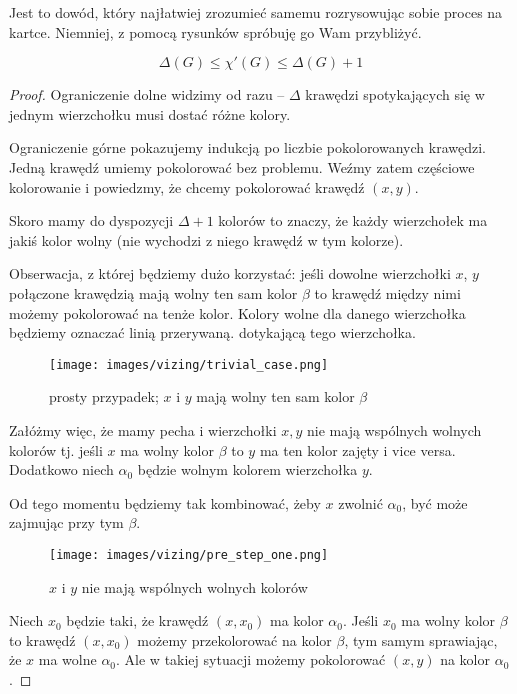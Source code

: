 Jest to dowód, który najłatwiej zrozumieć samemu rozrysowując sobie proces na kartce. Niemniej, z pomocą rysunków spróbuję go Wam przybliżyć.

\begin{theorem}[Vizing]
	\[\Delta(G) \leq \chi'(G) \leq \Delta(G) + 1\]
\end{theorem}

\begin{proof}
	Ograniczenie dolne widzimy od razu -- \(\Delta\) krawędzi spotykających się w jednym wierzchołku musi dostać różne kolory.

	Ograniczenie górne pokazujemy indukcją po liczbie pokolorowanych krawędzi. Jedną krawędź umiemy pokolorować bez problemu.
	Weźmy zatem częściowe kolorowanie i powiedzmy, że chcemy pokolorować krawędź \((x, y)\).

	Skoro mamy do dyspozycji \(\Delta + 1\) kolorów to znaczy, że każdy wierzchołek ma jakiś kolor wolny (nie wychodzi z niego krawędź w tym kolorze).

	Obserwacja, z której będziemy dużo korzystać: jeśli dowolne wierzchołki \(x\), \(y\) połączone krawędzią mają wolny ten sam kolor \(\beta\)
	to krawędź między nimi możemy pokolorować na tenże kolor. Kolory wolne dla danego wierzchołka będziemy oznaczać linią przerywaną. dotykającą tego wierzchołka.

	\begin{figure}[ht]
		\centering
		\texttt{[image: images/vizing/trivial\_case.png]}
		\caption{prosty przypadek; \(x\) i \(y\) mają wolny ten sam kolor \(\beta\)}
	\end{figure}

	Załóżmy więc, że mamy pecha i wierzchołki \(x, y\) nie mają wspólnych wolnych kolorów tj. jeśli \(x\) ma wolny kolor \(\beta\)
	to \(y\) ma ten kolor zajęty i vice versa. Dodatkowo niech \(\alpha_0\) będzie wolnym kolorem wierzchołka \(y\).

	Od tego momentu będziemy tak kombinować, żeby \(x\) zwolnić \(\alpha_0\), być może zajmując przy tym \(\beta\).

	\begin{figure}[H]
		\centering
		\texttt{[image: images/vizing/pre\_step\_one.png]}
		\caption{\(x\) i \(y\) nie mają wspólnych wolnych kolorów}
	\end{figure}


	Niech \(x_0\) będzie taki, że krawędź \((x, x_0)\) ma kolor \(\alpha_0\). Jeśli \(x_0\) ma wolny kolor \(\beta\)
	to krawędź \((x, x_0)\) możemy przekolorować na kolor \(\beta\),
	tym samym sprawiając, że \(x\) ma wolne \(\alpha_0\).
	Ale w takiej sytuacji możemy pokolorować \((x, y)\) na kolor \(\alpha_0\).


\end{proof}
